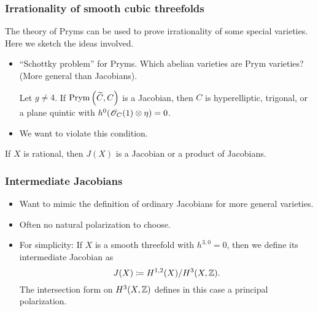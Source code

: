 \begin{frame}
\frametitle{Irrationality of smooth cubic threefolds}

The theory of Pryms can be used to prove irrationality of some special varieties. Here we sketch the ideas involved.
\pause

\begin{itemize}
	\item ``Schottky problem'' for Pryms.
	Which abelian varieties are Prym varieties? (More general than Jacobians).
	\begin{theorem}[Shokurov]
	Let $g \neq 4$. If $\operatorname{Prym}\Big(\widetilde C, C\Big)$ is a Jacobian, then $C$ is hyperelliptic, trigonal, or a plane quintic with $h^0(\mathscr{O}_C(1) \otimes \eta)=0$. 
	\end{theorem}
	\pause
	\item We want to violate this condition.
\end{itemize}

\begin{theorem}
If $X$ is rational, then $J(X)$ is a Jacobian or a product of Jacobians.
\end{theorem}

\end{frame}

\begin{frame}
\frametitle{Intermediate Jacobians}

\begin{itemize}[<+->]
	\item Want to mimic the definition of ordinary Jacobians for more general varieties.

	\item Often no natural polarization to choose.

	\item For simplicity: If $X$ is a smooth threefold with $h^{3,0}=0$, then we define its \alert{intermediate Jacobian} as
	\[
	J(X) \coloneqq H^{1,2}(X)/H^3(X,\mathbb{Z}).
	\]
	The intersection form on $H^3(X,\mathbb{Z})$ defines in this case a principal polarization.
\end{itemize}

\end{frame}

